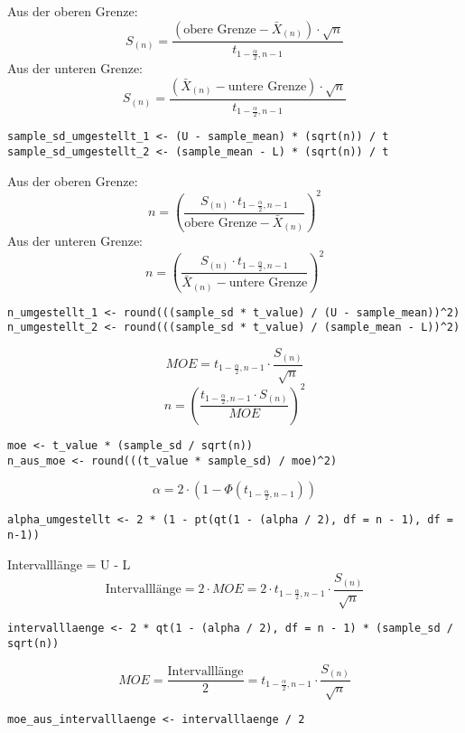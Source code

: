 \begin{multicols*}{2}

Aus der oberen Grenze:
$$
S_{(n)} = \frac{\left( \text{obere Grenze} - \bar{X}_{(n)} \right) \cdot \sqrt{n}}{t_{1 - \frac{\alpha}{2}, n-1}}
$$
Aus der unteren Grenze:
$$
S_{(n)} = \frac{\left( \bar{X}_{(n)} - \text{untere Grenze} \right) \cdot \sqrt{n}}{t_{1 - \frac{\alpha}{2}, n-1}}
$$
\begin{lstlisting}
sample_sd_umgestellt_1 <- (U - sample_mean) * (sqrt(n)) / t
sample_sd_umgestellt_2 <- (sample_mean - L) * (sqrt(n)) / t
\end{lstlisting}


Aus der oberen Grenze:
$$
n = \left( \frac{S_{(n)} \cdot t_{1 - \frac{\alpha}{2}, n-1}}{\text{obere Grenze} - \bar{X}_{(n)}} \right)^2
$$
Aus der unteren Grenze:
$$
n = \left( \frac{S_{(n)} \cdot t_{1 - \frac{\alpha}{2}, n-1}}{\bar{X}_{(n)} - \text{untere Grenze}} \right)^2
$$
\begin{lstlisting}
n_umgestellt_1 <- round(((sample_sd * t_value) / (U - sample_mean))^2)
n_umgestellt_2 <- round(((sample_sd * t_value) / (sample_mean - L))^2)
\end{lstlisting}

$$
MOE = t_{1 - \frac{\alpha}{2}, n-1} \cdot \frac{S_{(n)}}{\sqrt{n}}
$$
$$
n = \left( \frac{t_{1 - \frac{\alpha}{2}, n-1} \cdot S_{(n)}}{MOE} \right)^2
$$
\begin{lstlisting}
moe <- t_value * (sample_sd / sqrt(n))
n_aus_moe <- round(((t_value * sample_sd) / moe)^2)
\end{lstlisting}
$$
\alpha = 2 \cdot \left( 1 - \Phi\left(t_{1 - \frac{\alpha}{2}, n-1}\right) \right)
$$
\begin{lstlisting}
alpha_umgestellt <- 2 * (1 - pt(qt(1 - (alpha / 2), df = n - 1), df = n-1))
\end{lstlisting}


Intervalllänge = U - L
$$
\text{Intervalllänge} = 2 \cdot MOE = 2 \cdot t_{1 - \frac{\alpha}{2}, n-1} \cdot \frac{S_{(n)}}{\sqrt{n}}
$$
\begin{lstlisting}
intervalllaenge <- 2 * qt(1 - (alpha / 2), df = n - 1) * (sample_sd / sqrt(n))
\end{lstlisting}

$$
MOE = \frac{\text{Intervalllänge}}{2} = t_{1 - \frac{\alpha}{2}, n-1} \cdot \frac{S_{(n)}}{\sqrt{n}}
$$
\begin{lstlisting}
moe_aus_intervalllaenge <- intervalllaenge / 2
\end{lstlisting}
\end{multicols*}